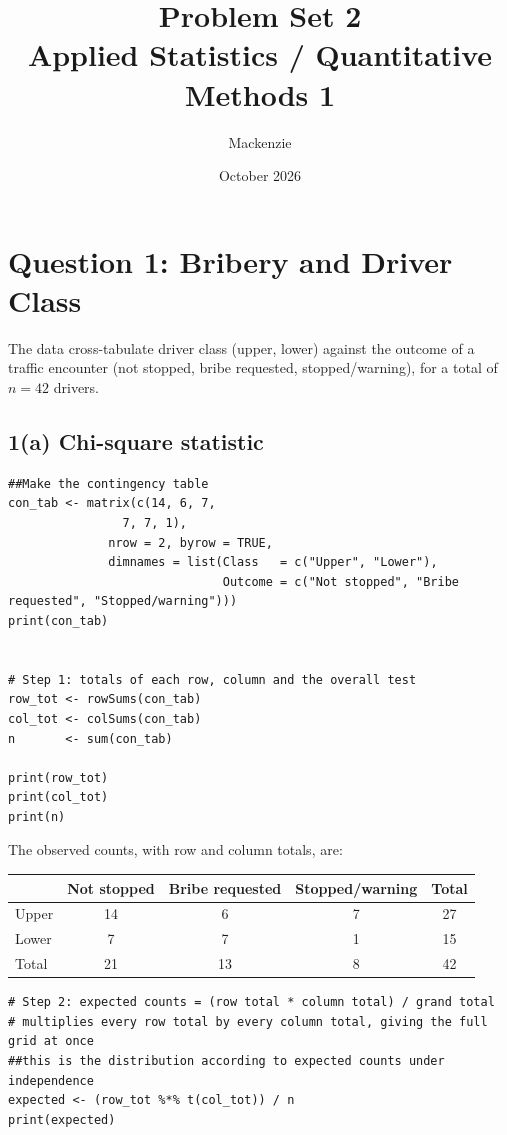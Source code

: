\documentclass[11pt]{article}
\title{Problem Set 2\\\large Applied Statistics / Quantitative Methods 1}
\author{Mackenzie}
\date{October 2026}
\begin{document}
\maketitle

\section*{Question 1: Bribery and Driver Class}

The data cross-tabulate driver class (upper, lower) against the outcome of a traffic encounter (not stopped, bribe requested, stopped/warning), for a total of $n = 42$ drivers.

\subsection*{1(a) Chi-square statistic}

\begin{lstlisting}
##Make the contingency table 
con_tab <- matrix(c(14, 6, 7,
                7, 7, 1),
              nrow = 2, byrow = TRUE,
              dimnames = list(Class   = c("Upper", "Lower"),
                              Outcome = c("Not stopped", "Bribe requested", "Stopped/warning")))
print(con_tab)


# Step 1: totals of each row, column and the overall test
row_tot <- rowSums(con_tab)
col_tot <- colSums(con_tab)
n       <- sum(con_tab)

print(row_tot)
print(col_tot)
print(n)

\end{lstlisting}

The observed counts, with row and column totals, are:

\begin{center}
\begin{tabular}{lcccc}
\toprule
 & Not stopped & Bribe requested & Stopped/warning & Total \\
\midrule
Upper & 14 & 6 & 7 & 27 \\
Lower & 7 & 7 & 1 & 15 \\
\midrule
Total & 21 & 13 & 8 & 42 \\
\bottomrule
\end{tabular}
\end{center}

\begin{lstlisting}
# Step 2: expected counts = (row total * column total) / grand total
# multiplies every row total by every column total, giving the full grid at once
##this is the distribution according to expected counts under independence
expected <- (row_tot %*% t(col_tot)) / n
print(expected)

\end{lstlisting}
\end{document}
